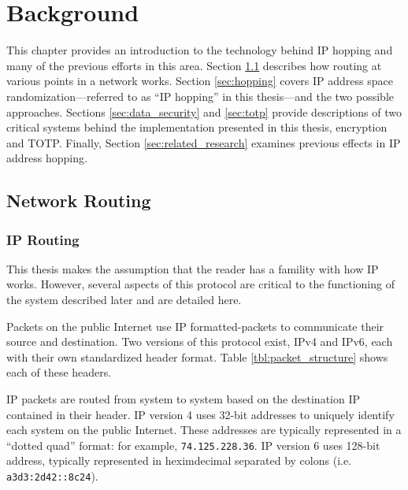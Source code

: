 \chapter{Background}
\label{chp:background}
\par This chapter provides an introduction to the technology behind \ac{IP} hopping and many of the previous efforts in this area. Section \ref{sec:routing} describes how routing at various points in a network works. Section \ref{sec:hopping} covers IP address space randomization---referred to as ``\ac{IP} hopping'' in this thesis---and the two possible approaches. Sections \ref{sec:data_security} and \ref{sec:totp} provide descriptions of two critical systems behind the implementation presented in this thesis, encryption and \ac{TOTP}. Finally, Section \ref{sec:related_research} examines previous effects in \ac{IP} address hopping.

\section{Network Routing}
\label{sec:routing}

\subsection{\ac{IP} Routing}
\label{sec:ip_routing}
\par This thesis makes the assumption that the reader has a famility with how \ac{IP} works. However, several aspects of this protocol are critical to the functioning of the system described later and are detailed here. 

\par Packets on the public Internet use \ac{IP} formatted-packets to communicate their source and destination. Two versions of this protocol exist, \ac{IPv4} and \ac{IPv6}, each with their own standardized header format. Table \ref{tbl:packet_structure} shows each of these headers.

\par \ac{IP} packets are routed from system to system based on the destination \ac{IP} contained in their header. IP version 4 uses 32-bit addresses to uniquely identify each system on the public Internet. These addresses are typically represented in a ``dotted quad'' format: for example, \texttt{74.125.228.36}. IP version 6 uses 128-bit address, typically represented in heximdecimal separated by colons (i.e. \texttt{a3d3:2d42::8c24}).


